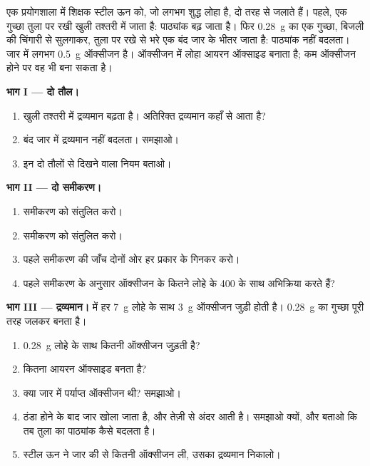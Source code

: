 \begin{problem}
\label{pb:g8:balanced-equations:1}
एक प्रयोगशाला में शिक्षक स्टील ऊन को, जो लगभग शुद्ध लोहा है, दो तरह से
जलाते हैं। पहले, एक गुच्छा तुला पर रखी खुली तश्तरी में  जाता है:
पाठ्यांक बढ़ जाता है। फिर \qty{0.28}{g} का एक गुच्छा, बिजली की चिंगारी से
सुलगाकर, तुला पर रखे  से भरे एक बंद जार के भीतर  जाता है:
पाठ्यांक नहीं बदलता। जार में लगभग \qty{0.5}{g} ऑक्सीजन है।
ऑक्सीजन में  लोहा आयरन ऑक्साइड  बनाता है; कम ऑक्सीजन होने पर
वह  भी बना सकता है।

\medskip
\noindent\textbf{भाग I --- दो तौल।}
\begin{enumerate}
  \item खुली तश्तरी में द्रव्यमान बढ़ता है। अतिरिक्त द्रव्यमान कहाँ से
        आता है?
  \item बंद जार में द्रव्यमान नहीं बदलता। समझाओ।
  \item इन दो तौलों से दिखने वाला नियम बताओ।
\end{enumerate}

\medskip
\noindent\textbf{भाग II --- दो समीकरण।}
\begin{enumerate}[resume]
  \item समीकरण  को संतुलित करो। %
  \item समीकरण  को संतुलित करो। %
  \item पहले समीकरण की जाँच दोनों ओर हर प्रकार के 
        गिनकर करो।
  \item पहले समीकरण के अनुसार ऑक्सीजन के कितने  लोहे के 400  के
        साथ अभिक्रिया करते हैं?
\end{enumerate}

\medskip
\noindent\textbf{भाग III --- द्रव्यमान।}
 में हर \qty{7}{g} लोहे के साथ \qty{3}{g}
ऑक्सीजन जुड़ी होती है। \qty{0.28}{g} का गुच्छा पूरी तरह जलकर  बनता है।
\begin{enumerate}[resume]
  \item \qty{0.28}{g} लोहे के साथ कितनी ऑक्सीजन जुड़ती है?
  \item कितना आयरन ऑक्साइड बनता है?
  \item क्या जार में पर्याप्त ऑक्सीजन थी? समझाओ।
  \item ठंडा होने के बाद जार खोला जाता है, और  तेज़ी से अंदर आती है।
        समझाओ क्यों, और बताओ कि तब तुला का पाठ्यांक कैसे बदलता है।
  \item {} स्टील ऊन ने जार की  से कितनी ऑक्सीजन ली, उसका द्रव्यमान
        निकालो।
\end{enumerate}
\end{problem}
